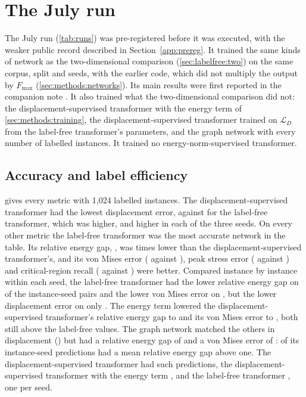 \section{The July run}\label{app:july}

The July run (\cref{tab:runs}) was pre-registered before it was executed, with the weaker
public record described in Section~\ref{app:prereg}. It trained the same kinds of network as
the two-dimensional comparison (\cref{sec:labelfree:two}) on the same corpus, split and
seeds, with the earlier code, which did not multiply the output by $F_{\max}$
(\cref{sec:methods:networks}). Its main results were first reported in the companion note
\cite{CaoSong2026}. It also trained what the two-dimensional comparison did not: the
displacement-supervised transformer with the energy term of \cref{sec:methods:training}, the
displacement-supervised transformer trained on $\mathcal{L}_D$ from the label-free
transformer's parameters, and the graph network with every number of labelled instances. It
trained no energy-norm-supervised transformer.

\subsection{Accuracy and label efficiency}\label{app:july:accuracy}



 gives every metric with 1,024 labelled instances. The
displacement-supervised transformer had the lowest displacement error, \numTwoLabDispFour{} against
\numTwoFreeDispFour{} for the label-free transformer, which was \numTwoFreeDispExcessAbs{}
higher, and higher in each of the three seeds. On every other metric the label-free
transformer was the most accurate network in the table. Its relative energy gap,
\numTwoFreeGap{}, was \numTwoLabOverFreeGap{} times lower than the displacement-supervised
transformer's, and its von Mises error (\numTwoFreeVm{} against \numTwoLabVm{}), peak stress
error (\numTwoFreePeak{} against \numTwoLabPeak{}) and critical-region recall
(\numTwoFreeRecall{} against \numTwoLabRecall{}) were better. Compared instance by instance
within each seed, the label-free transformer had the lower relative energy gap on
\numPairTwoLabGap{} of the \numTwoPairs{} instance-seed pairs and the lower von Mises error
on \numPairTwoLabVm{}, but the lower displacement error on only \numPairTwoLabDisp{}. The
energy term lowered the displacement-supervised transformer's relative energy gap to
\numTwoAncGap{} and its von Mises error to \numTwoAncVm{}, both still above the label-free
values. The graph network matched the others in displacement (\numTwoMgnDisp{}) but had a
relative energy gap of \numTwoMgnGap{} and a von Mises error of \numTwoMgnVm{}:
\numTwoMgnWorse{} of its \numTwoPairs{} instance-seed predictions had a mean relative energy
gap above one. The displacement-supervised transformer had \numTwoLabWorse{} such
predictions, the displacement-supervised transformer with the energy term \numTwoAncWorse{},
and the label-free transformer \numTwoFreeWorse{}, one per seed.

